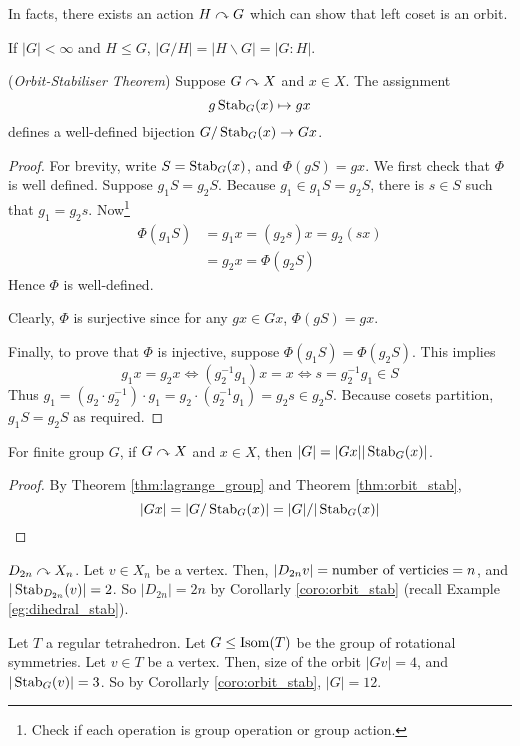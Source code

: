 \documentclass[10pt, a4paper, twoside]{report}
\begin{document}
In facts, there exists an action \(H\curvearrowright G\) which can show that left coset is an orbit.
\begin{lemma}
    If \(|G|<\infty\) and \(H\leq G\), \(|G/H|=|H\backslash G|=|G:H|\).
\end{lemma}
\begin{theorem}
    (\emph{Orbit-Stabiliser Theorem}) Suppose \(G\curvearrowright X\) and \(x\in X\). The assignment \[g\operatorname{Stab}_G(x)\mapsto gx\] defines a well-defined bijection \(G/\operatorname{Stab}_G(x)\to Gx\).
    \label{thm:orbit_stab}
\end{theorem}
\begin{proof}
    For brevity, write \(S=\operatorname{Stab}_G(x)\), and \(\Phi(gS)=gx\). We first check that \(\Phi\) is well defined. Suppose \(g_1S=g_2S\). Because \(g_1\in g_1S=g_2S\), there is \(s\in S\) such that \(g_1=g_2s\). Now\footnote{Check if each operation is group operation or group action.}
    \begin{align*}
        \Phi(g_1S)&=g_1x=(g_2s)x=g_2(sx) \\
        &=g_2x=\Phi(g_2S)
    \end{align*}
    Hence \(\Phi\) is well-defined.

    Clearly, \(\Phi\) is surjective since for any \(gx\in Gx\), \(\Phi(gS)=gx\).

    Finally, to prove that \(\Phi\) is injective, suppose \(\Phi(g_1S)=\Phi(g_2S)\). This implies 
    \[g_1x=g_2x\Leftrightarrow (g_2^{-1}g_1)x=x\Leftrightarrow s=g_2^{-1}g_1\in S\]
    Thus \(g_1=(g_2\cdot g_2^{-1})\cdot g_1=g_2\cdot(g_2^{-1}g_1)=g_2s\in g_2S\).
    Because cosets partition, \(g_1S=g_2S\) as required.
\end{proof}
\begin{corollary}
    For finite group \(G\), if \(G\curvearrowright X\) and \(x\in X\), then \(|G|=|Gx||\operatorname{Stab}_G(x)|\).
    \label{coro:orbit_stab}
\end{corollary}
\begin{proof}
    By Theorem \ref{thm:lagrange_group} and Theorem \ref{thm:orbit_stab}, 
    \[|Gx|=|G/\operatorname{Stab}_G(x)|=|G|/|\operatorname{Stab}_G(x)|\]
\end{proof}
\begin{example}
    \(D_{2n}\curvearrowright X_n\). Let \(v\in X_n\) be a vertex. Then, \(|D_{2n}v|=\text{number of verticies}\\=n\), and \(|\operatorname{Stab}_{D_{2n}}(v)|=2\). So \(|D_{2n}|=2n\) by Corollarly \ref{coro:orbit_stab} (recall Example \ref{eg:dihedral_stab}).
\end{example}
\begin{example}
    Let \(T\) a regular tetrahedron. Let \(G\leq\operatorname{Isom}(T)\) be the group of rotational symmetries. Let \(v\in T\) be a vertex. Then, size of the orbit \(|Gv|=4\), and \(|\operatorname{Stab}_G(v)|=3\). So by Corollarly \ref{coro:orbit_stab}, \(|G|=12\). 
    \label{eg:tetrahedron_rot}
\end{example}
\end{document}
